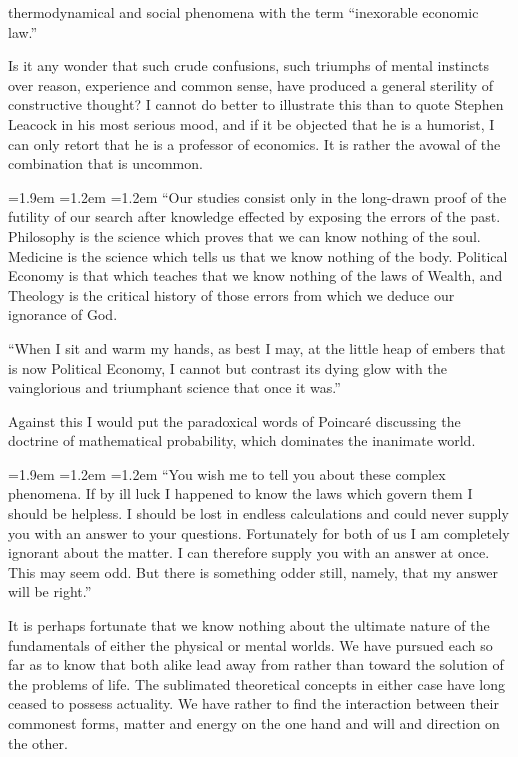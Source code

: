 \documentclass[10.5pt,twoside]{book}
\newenvironment{extract}
  {\par\addvspace{7pt}\begingroup\small\linespread{1.02}\selectfont
   \leftskip=1.9em \rightskip=1.2em \parindent=1.2em \noindent\ignorespaces}
  {\par\endgroup\addvspace{7pt}}
\newcommand{\origpage}[1]{\clearpage\setcounter{page}{#1}}
\begin{document}
\origpage{8}

\noindent thermodynamical and social phenomena with the term ``inexorable
economic law.''

Is it any wonder that such crude confusions, such triumphs of mental instincts
over reason, experience and common sense, have produced a general sterility of
constructive thought? I cannot do better to illustrate this than to quote
Stephen Leacock in his most serious mood, and if it be objected that he is a
humorist, I can only retort that he is a professor of economics. It is rather
the avowal of the combination that is uncommon.

\begin{extract}
``Our studies consist only in the long-drawn proof of the futility of our
search after knowledge effected by exposing the errors of the past. Philosophy
is the science which proves that we can know nothing of the soul. Medicine is
the science which tells us that we know nothing of the body. Political Economy
is that which teaches that we know nothing of the laws of Wealth, and Theology
is the critical history of those errors from which we deduce our ignorance of
God.

``When I sit and warm my hands, as best I may, at the little heap of embers
that is now Political Economy, I cannot but contrast its dying glow with the
vainglorious and triumphant science that once it was.''
\end{extract}

Against this I would put the paradoxical words of Poincar\'e discussing the
doctrine of mathematical probability, which dominates the inanimate world.

\begin{extract}
``You wish me to tell you about these complex phenomena. If by ill luck I
happened to know the laws which govern them I should be helpless. I should be
lost in endless calculations and could never supply you with an answer to your
questions. Fortunately for both of us I am completely ignorant about the
matter. I can therefore supply you with an answer at once. This may seem odd.
But there is something odder still, namely, that my answer will be right.''
\end{extract}

It is perhaps fortunate that we know nothing about the ultimate nature of the
fundamentals of either the physical or mental worlds. We have pursued each so
far as to know that both alike lead away from rather than toward the solution
of the problems of life. The sublimated theoretical concepts in either case
have long ceased to possess actuality. We have rather to find the interaction
between their commonest forms, matter and energy on the one hand and will and
direction on the other.
\end{document}
